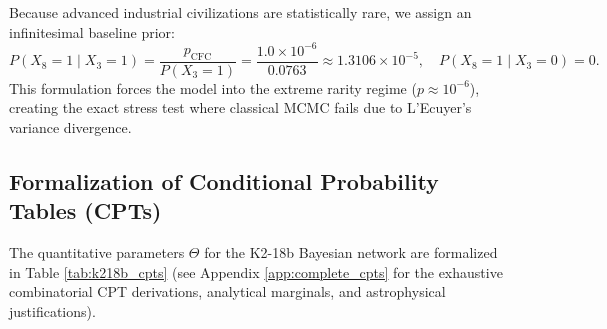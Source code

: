 Because advanced industrial civilizations are statistically rare, we assign an infinitesimal baseline prior:
\begin{equation}
P(X_8 = 1 \mid X_3 = 1) = \frac{p_{\mathrm{CFC}}}{P(X_3=1)} = \frac{1.0 \times 10^{-6}}{0.0763} \approx 1.3106 \times 10^{-5}, \quad P(X_8 = 1 \mid X_3 = 0) = 0.
\label{eq:cfc_conditional_prior}
\end{equation}
This formulation forces the model into the extreme rarity regime ($p \approx 10^{-6}$), creating the exact stress test where classical MCMC fails due to L'Ecuyer's variance divergence.

\subsection{Formalization of Conditional Probability Tables (CPTs)}
The quantitative parameters $\Theta$ for the K2-18b Bayesian network are formalized in Table \ref{tab:k218b_cpts} (see Appendix \ref{app:complete_cpts} for the exhaustive combinatorial CPT derivations, analytical marginals, and astrophysical justifications).

